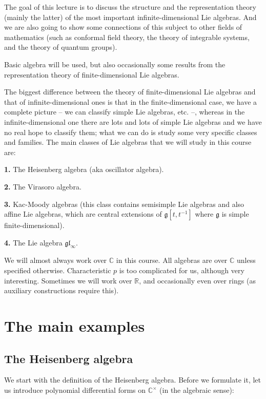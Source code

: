 \documentclass
[numbers=enddot,12pt,final,onecolumn,german,notitlepage]{scrartcl}%
\theoremstyle{definition}
\begin{document}
The goal of this lecture is to discuss the structure and the representation
theory (mainly the latter) of the most important infinite-dimensional Lie
algebras. And we are also going to show some connections of this subject to
other fields of mathematics (such as conformal field theory, the theory of
integrable systems, and the theory of quantum groups).

Basic algebra will be used, but also occasionally some results from the
representation theory of finite-dimensional Lie algebras.

The biggest difference between the theory of finite-dimensional Lie algebras
and that of infinite-dimensional ones is that in the finite-dimensional case,
we have a complete picture -- we can classify simple Lie algebras, etc. --,
whereas in the infinite-dimensional one there are lots and lots of simple Lie
algebras and we have no real hope to classify them; what we can do is study
some very specific classes and families. The main classes of Lie algebras that
we will study in this course are:

\textbf{1.} The Heisenberg algebra (aka oscillator algebra).

\textbf{2.} The Virasoro algebra.

\textbf{3.} Kac-Moody algebras (this class contains semisimple Lie algebras
and also affine Lie algebras, which are central extensions of $\mathfrak{g}%
\left[  t,t^{-1}\right]  $ where $\mathfrak{g}$ is simple finite-dimensional).

\textbf{4.} The Lie algebra $\mathfrak{gl}_{\infty}$.

We will almost always work over $\mathbb{C}$ in this course. All algebras are
over $\mathbb{C}$ unless specified otherwise. Characteristic $p$ is too
complicated for us, although very interesting. Sometimes we will work over
$\mathbb{R}$, and occasionally even over rings (as auxiliary constructions
require this).

\section{The main examples}

\subsection{The Heisenberg algebra}

We start with the definition of the Heisenberg algebra. Before we formulate
it, let us introduce polynomial differential forms on $\mathbb{C}^{\times}$
(in the algebraic sense):
\end{document}
